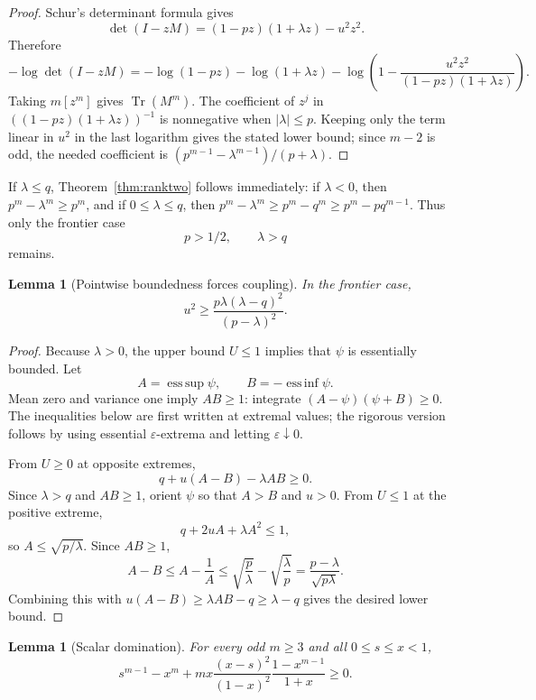 \documentclass[11pt]{article}
\newtheorem{lemma}[theorem]{Lemma}
\newcommand{\Tr}{\operatorname{Tr}}
\begin{document}
\begin{proof}
Schur's determinant formula gives
\[
        \det(I-zM)=(1-pz)(1+\lambda z)-u^2z^2.
\]
Therefore
\[
        -\log\det(I-zM)= -\log(1-pz)-\log(1+\lambda z)
        -\log\left(1-\frac{u^2z^2}{(1-pz)(1+\lambda z)}\right).
\]
Taking $m[z^m]$ gives $\Tr(M^m)$.  The coefficient of $z^j$ in $((1-pz)(1+\lambda z))^{-1}$ is nonnegative when $|\lambda|\le p$.  Keeping only the term linear in $u^2$ in the last logarithm gives the stated lower bound; since $m-2$ is odd, the needed coefficient is $(p^{m-1}-\lambda^{m-1})/(p+\lambda)$.
\end{proof}

If $\lambda\le q$, Theorem~\ref{thm:ranktwo} follows immediately: if $\lambda<0$, then $p^m-\lambda^m\ge p^m$, and if $0\le\lambda\le q$, then $p^m-\lambda^m\ge p^m-q^m\ge p^m-pq^{m-1}$.  Thus only the frontier case
\[
        p>1/2,
        \qquad \lambda>q
\]
remains.

\begin{lemma}[Pointwise boundedness forces coupling]\label{lem:ranktwo-coupling}
In the frontier case,
\[
        u^2\ge
        \frac{p\lambda(\lambda-q)^2}{(p-\lambda)^2}.
\]
\end{lemma}

\begin{proof}
Because $\lambda>0$, the upper bound $U\le1$ implies that $\psi$ is essentially bounded.  Let
\[
        A=\operatorname*{ess\,sup}\psi,
        \qquad B=-\operatorname*{ess\,inf}\psi.
\]
Mean zero and variance one imply $AB\ge1$: integrate $(A-\psi)(\psi+B)\ge0$.  The inequalities below are first written at extremal values; the rigorous version follows by using essential $\varepsilon$-extrema and letting $\varepsilon\downarrow0$.

From $U\ge0$ at opposite extremes,
\[
        q+u(A-B)-\lambda AB\ge0.
\]
Since $\lambda>q$ and $AB\ge1$, orient $\psi$ so that $A>B$ and $u>0$.  From $U\le1$ at the positive extreme,
\[
        q+2uA+\lambda A^2\le1,
\]
so $A\le\sqrt{p/\lambda}$.  Since $AB\ge1$,
\[
        A-B\le A-\frac1A\le
        \sqrt{\frac p\lambda}-\sqrt{\frac\lambda p}
        =\frac{p-\lambda}{\sqrt{p\lambda}}.
\]
Combining this with $u(A-B)\ge\lambda AB-q\ge\lambda-q$ gives the desired lower bound.
\end{proof}

\begin{lemma}[Scalar domination]\label{lem:ranktwo-scalar}
For every odd $m\ge3$ and all $0\le s\le x<1$,
\[
        s^{m-1}-x^m
        +m x\frac{(x-s)^2}{(1-x)^2}\frac{1-x^{m-1}}{1+x}
        \ge0.
\]
\end{lemma}
\end{document}
